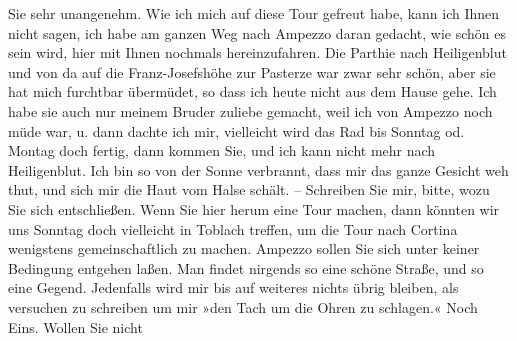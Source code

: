 \begin{ledgroupsized}[t]{13cm}
{                  Sie}{}\label{K_L03128-5h} sehr
               unangenehm. Wie ich mich auf diese Tour gefreut habe, kann ich Ihnen nicht sagen, ich
               habe am ganzen Weg nach Ampezzo daran gedacht,
               wie schön es sein wird, hier mit Ihnen nochmals hereinzufahren. Die Parthie nach Heiligenblut und von da auf die Franz-Josefshöhe zur Pasterze war zwar sehr schön, aber sie hat mich furchtbar
               übermüdet, so dass ich heute nicht aus dem Hause gehe.
               Ich habe sie auch nur meinem Bruder zuliebe gemacht, weil ich von Ampezzo noch müde war, u. dann dachte ich mir, vielleicht
               wird das Rad bis Sonntag od. Montag doch fertig, dann kommen Sie, und ich kann nicht mehr nach Heiligenblut. Ich bin so von der Sonne
               verbrannt, dass mir das ganze Gesicht weh thut, und sich mir die Haut vom Halse
               schält. –\pend
           \pstart
           {\pb}Schreiben Sie mir, bitte,
               wozu Sie sich entschließen. Wenn Sie hier herum eine Tour machen, dann könnten wir
               uns Sonntag doch vielleicht in Toblach treffen, um die Tour nach Cortina wenigstens gemeinschaftlich zu machen.\pend
           \pstart
           Ampezzo sollen Sie sich unter keiner Bedingung
               entgehen laßen. Man findet nirgends so eine schöne Straße, und so eine Gegend.\pend
           \pstart
           Jedenfalls wird mir bis auf weiteres nichts übrig bleiben, als versuchen zu
                  schreiben um mir »den Tach um die Ohren zu schlagen.«\pend
           \pstart
           Noch Eins. Wollen Sie nicht \label{K_L03128-6v}
\end{ledgroupsized}
